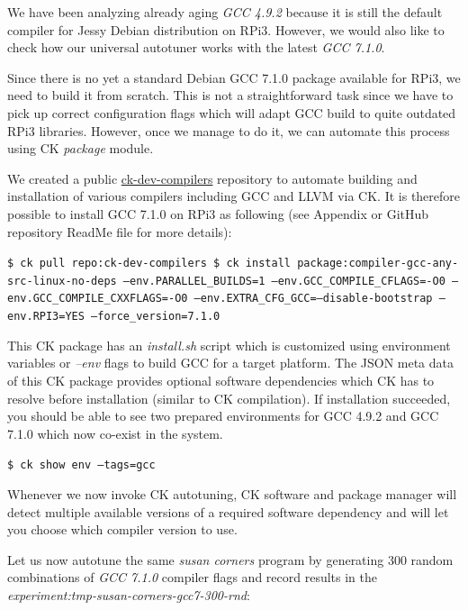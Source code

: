 We have been analyzing already aging \textit{GCC 4.9.2} because 
it is still the default compiler for Jessy Debian distribution on RPi3.
%
However, we would also like to check how our universal autotuner
works with the latest \textit{GCC 7.1.0}.

Since there is no yet a standard Debian GCC 7.1.0 package available for RPi3,
we need to build it from scratch.
%
This is not a straightforward task since we have to pick up correct 
configuration flags which will adapt GCC build to quite outdated RPi3 libraries.
%
However, once we manage to do it, we can automate this process
using CK \textit{package} module. 

We created a public \href{https://github.com/ctuning/ck-dev-compilers}{ck-dev-compilers} repository
to automate building and installation of various compilers including GCC and LLVM via CK.
%
It is therefore possible to install GCC 7.1.0 on RPi3 as following 
(see Appendix or GitHub repository ReadMe file for more details):

\begin{flushleft}
\texttt{\$ ck pull repo:ck-dev-compilers \newline
\$ ck install package:compiler-gcc-any-src-linux-no-deps --env.PARALLEL\_BUILDS=1 --env.GCC\_COMPILE\_CFLAGS=-O0 --env.GCC\_COMPILE\_CXXFLAGS=-O0 --env.EXTRA\_CFG\_GCC=--disable-bootstrap --env.RPI3=YES --force\_version=7.1.0}
\end{flushleft}

This CK package has an \textit{install.sh} script which is customized 
using environment variables or \textit{--env} flags to build GCC for a target platform.
%
The JSON meta data of this CK package provides optional software dependencies 
which CK has to resolve before installation (similar to CK compilation).
%
If installation succeeded, you should be able to see two prepared environments
for GCC 4.9.2 and GCC 7.1.0 which now co-exist in the system.

\begin{flushleft}
\texttt{\$ ck show env --tags=gcc}
\end{flushleft}

Whenever we now invoke CK autotuning, CK software and package manager 
will detect multiple available versions of a required software dependency
and will let you choose which compiler version to use.
%

Let us now autotune the same \textit{susan corners} program 
by generating 300 random combinations of \textit{GCC 7.1.0} compiler flags
and record results in the \textit{experiment:tmp-susan-corners-gcc7-300-rnd}:

